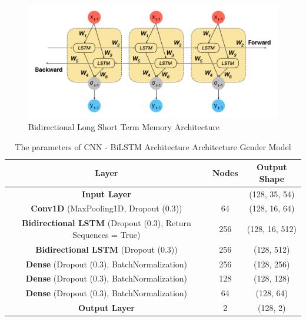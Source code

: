 \documentclass[conference, 10pt,onecolumn]{IEEEtran}
\begin{document}
\begin{figure}
    \centering
    \includegraphics[width=4 in]{BiLSTM architecture.pdf}
    \caption{Bidirectional Long Short Term Memory Architecture}
    \label{fig:BiLSTM architecture}
\end{figure}

\begin{table}[]
    \centering
    \begin{tabular}{|c|c|c|}
        \hline
        \textbf{Layer} & \textbf{Nodes} & \textbf{Output Shape} \\ \hline
        \textbf{Input Layer} & & (128, 35, 54)\\
        \textbf{Conv1D} (MaxPooling1D, Dropout (0.3)) & 64 & (128, 16, 64)\\
        \textbf{Bidirectional LSTM} (Dropout (0.3), Return Sequences = True) & 256 & (128, 16, 512)\\
        \textbf{Bidirectional LSTM} (Dropout (0.3)) & 256 & (128, 512)\\
        \textbf{Dense} (Dropout (0.3), BatchNormalization) & 256 & (128, 256)\\
        \textbf{Dense} (Dropout (0.3), BatchNormalization) & 128 & (128, 128)\\
        \textbf{Dense} (Dropout (0.3), BatchNormalization) & 64 & (128, 64)\\
        \textbf{Output Layer} & 2 & (128, 2)\\
        
         \hline
    \end{tabular}
    \caption{The parameters of CNN - BiLSTM Architecture Architecture Gender Model}
    \label{tab:CNN -BiLSTM Architecture Gender}
\end{table}
\end{document}
